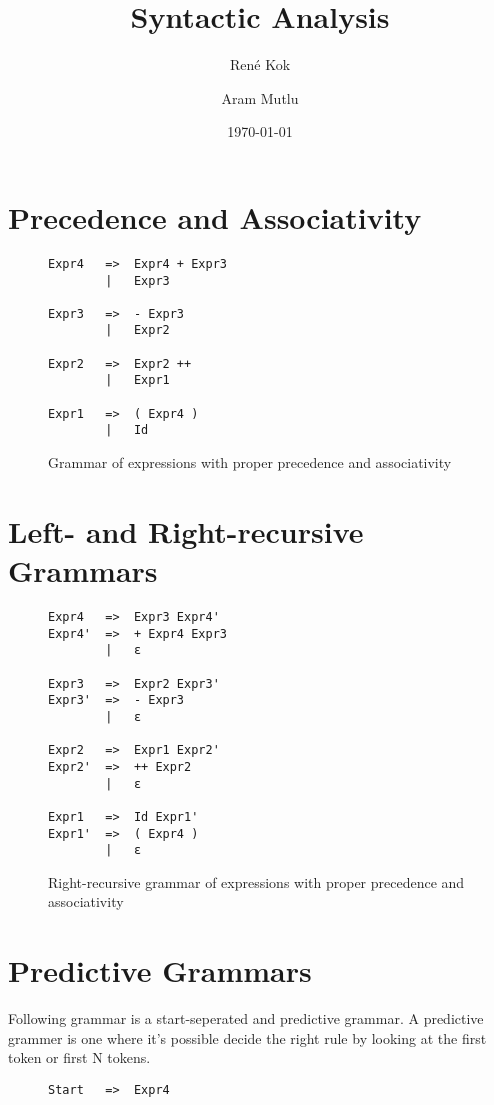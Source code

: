 \documentclass[hidelinks]{uva-inf-article}
\title{Syntactic Analysis}
\author{René Kok}
\author{Aram Mutlu}
\date{\today}
\begin{document}
\maketitle

\begin{flushleft}


\section{Precedence and Associativity}
\begin{figure}[h]
\begin{lstlisting}
Expr4   =>  Expr4 + Expr3 
        |   Expr3

Expr3   =>  - Expr3 
        |   Expr2

Expr2   =>  Expr2 ++ 
        |   Expr1
        
Expr1   =>  ( Expr4 ) 
        |   Id
\end{lstlisting}
\caption{Grammar of expressions with proper precedence and associativity}
\label{fig:1}
\end{figure}
\newpage
\section{Left- and Right-recursive Grammars}
\begin{figure}[h]
\begin{lstlisting}
Expr4   =>  Expr3 Expr4'
Expr4'  =>  + Expr4 Expr3
        |   ε
    
Expr3   =>  Expr2 Expr3'
Expr3'  =>  - Expr3
        |   ε
    
Expr2   =>  Expr1 Expr2'
Expr2'  =>  ++ Expr2
        |   ε
    
Expr1   =>  Id Expr1'
Expr1'  =>  ( Expr4 )
        |   ε
\end{lstlisting}
\caption{Right-recursive grammar of expressions with proper precedence and associativity}
\label{fig:2}
\end{figure}
\section{Predictive Grammars}
Following grammar is a start-seperated and predictive grammar.
A predictive grammer is one where it's possible decide the right rule by looking at the first token or first N tokens.
\begin{figure}[h]
\begin{lstlisting}
Start   =>  Expr4


\end{lstlisting}
\end{figure}
\end{flushleft}
\end{document}
